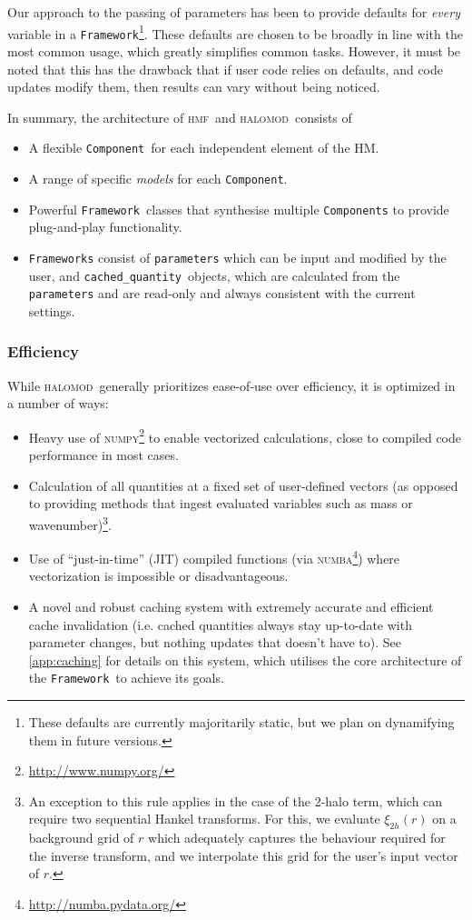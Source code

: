 \documentclass[5p,aas_macros]{elsarticle}
\newcommand{\halomod}{\textsc{halomod}}
\newcommand{\hmf}{\textsc{hmf}}
\newcommand{\framework}{\texttt{Framework}}
\newcommand{\component}{\texttt{Component}}
\newcommand{\cached}{\texttt{cached\_quantity}}
\begin{document}
Our approach to the passing of parameters has been to provide defaults for \textit{every} variable in a \framework\footnote{These defaults are currently majoritarily static, but we plan on dynamifying them in future versions.}. These defaults are chosen to be broadly in line with the most common usage, which greatly simplifies common tasks. However, it must be noted that this has the drawback that if user code relies on defaults, and code updates modify them, then results can vary without being noticed. 

In summary, the architecture of \hmf\ and \halomod\ consists of
\begin{itemize}
    \item A flexible \component\ for each independent element of the HM.
    \item A range of specific \textit{models} for each \component.
    \item Powerful \framework\ classes that synthesise multiple \verb|Components| to provide plug-and-play functionality.
    \item \texttt{Frameworks} consist of \texttt{parameters} which can be input and modified by the user, and \cached\ objects, which are calculated from the \verb|parameters| and are read-only and always consistent with the current settings.
\end{itemize}



\subsubsection{Efficiency}
\label{sec:halomod:overview:efficiency}

While \halomod\ generally prioritizes ease-of-use over efficiency, it is optimized in a number of ways:
\begin{itemize}
    \item Heavy use of \textsc{numpy}\footnote{\url{http://www.numpy.org/}} to enable vectorized calculations, close to compiled code performance in most cases.
    \item Calculation of all quantities at a fixed set of user-defined vectors (as opposed to providing methods that ingest evaluated variables such as mass or wavenumber)\footnote{An exception to this rule applies in the case of the 2-halo term, which can require two sequential Hankel transforms. For this, we evaluate $\xi_{2h}(r)$ on a background grid of $r$ which adequately captures the behaviour required for the inverse transform, and we interpolate this grid for the user's input vector of $r$.}.
    \item Use of ``just-in-time'' (JIT) compiled functions (via \textsc{numba}\footnote{\url{http://numba.pydata.org/}}) where vectorization is impossible or disadvantageous.
    \item A novel and robust caching system with extremely accurate and efficient cache invalidation (i.e. cached quantities always stay up-to-date with parameter changes, but nothing updates that doesn't have to). See \ref{app:caching} for details on this system, which utilises the core architecture of the \framework\ to achieve its goals.
\end{itemize}
\end{document}

